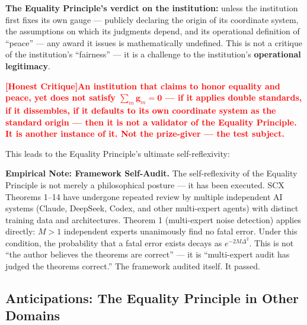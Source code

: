 \documentclass[12pt,a4paper]{article}
\theoremstyle{remark}
\newcommand{\honestcrit}[1]{%
    \textcolor{red}{\textbf{[Honest Critique]#1}}%
}
\begin{document}
\textbf{The Equality Principle's verdict on the institution:} unless the institution first fixes its own gauge --- publicly declaring the origin of its coordinate system, the assumptions on which its judgments depend, and its operational definition of ``peace'' --- any award it issues is mathematically undefined. This is not a critique of the institution's ``fairness'' --- it is a challenge to the institution's \textbf{operational legitimacy}.

\honestcrit{An institution that claims to honor equality and peace, yet does not satisfy $\sum_m \mathbf{g}_m = \mathbf{0}$ --- if it applies double standards, if it dissembles, if it defaults to its own coordinate system as the standard origin --- then it is not a validator of the Equality Principle. It is another instance of it. Not the prize-giver --- the test subject.}

This leads to the Equality Principle's ultimate self-reflexivity:

\begin{center}
\end{center}

\textbf{Empirical Note: Framework Self-Audit.} The self-reflexivity of the Equality Principle is not merely a philosophical posture --- it has been executed. SCX Theorems 1--14 have undergone repeated review by multiple independent AI systems (Claude, DeepSeek, Codex, and other multi-expert agents) with distinct training data and architectures. Theorem 1 (multi-expert noise detection) applies directly: $M > 1$ independent experts unanimously find no fatal error. Under this condition, the probability that a fatal error exists decays as $e^{-2M\Delta^2}$. This is not ``the author believes the theorems are correct'' --- it is ``multi-expert audit has judged the theorems correct.'' The framework audited itself. It passed.

\subsection{Anticipations: The Equality Principle in Other Domains}
\label{sec:implications}
\end{document}
